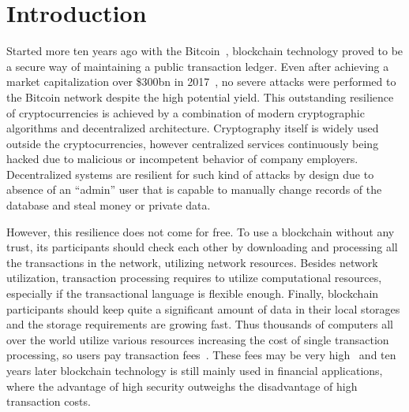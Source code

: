 \section{Introduction}
\label{sec:intro}


Started more ten years ago with the Bitcoin~\cite{nakamoto2008bitcoin}, blockchain technology proved
to be a secure way of maintaining a public transaction ledger.
Even after achieving a market capitalization over \$300bn in 2017~\cite{btcPrice},
no severe attacks were performed to the Bitcoin network despite the high potential yield.
This outstanding resilience of cryptocurrencies is achieved by a combination of modern cryptographic algorithms
and decentralized architecture.
Cryptography itself is widely used outside the cryptocurrencies, however centralized services continuously
being hacked\cite{sanger2015bank,leskin2018top} due to malicious or incompetent behavior of company employers.
Decentralized systems are resilient for such kind of attacks by design due to absence of an ``admin'' user
that is capable to manually change records of the database and steal money or private data.

However, this resilience does not come for free.
To use a blockchain without any trust, its participants should check each other by downloading and
processing all the transactions in the network, utilizing network resources.
Besides network utilization, transaction processing requires to utilize computational resources,
especially if the transactional language is flexible enough.
Finally, blockchain participants should keep quite a significant amount of data in their local storages and
the storage requirements are growing fast.
Thus thousands of computers all over the world utilize various resources
increasing the cost of single transaction processing,
so users pay transaction fees~\cite{chepurnoy2018systematic}. 
These fees may be very high~\cite{bitcoinFees}
and ten years later blockchain technology is still mainly used in financial applications, where the advantage of
high security outweighs the disadvantage of high transaction costs.

